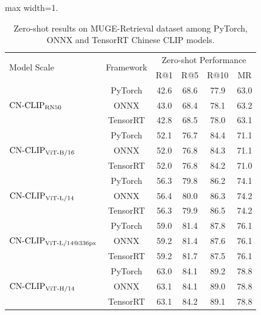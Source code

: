 \begin{table}[t]
\center
\small
\begin{adjustbox}{max width=1.\textwidth}
\begin{tabular}{@{\extracolsep{\fill}}lccccc}
\toprule
  \multirow{2}{*}{Model Scale} & \multirow{2}{*}{Framework}
  &\multicolumn{4}{c}{Zero-shot Performance}
  \\
   &  & R@1 & R@5 & R@10 & MR
  \\
\midrule
  \multirow{3}{*}{$\text{CN-CLIP}\rm_{RN50}$}
  & PyTorch	& 42.6	& 68.6	& 77.9	& 63.0 
  \\
  & ONNX	& 43.0 & 68.4 & 78.1 & 63.2
  \\
  & TensorRT	& 42.8 & 68.5 & 78.0 & 63.1
  \\ \midrule
  \multirow{3}{*}{$\text{CN-CLIP}\rm_{ViT\text{-}B/16}$}
  & PyTorch	& 52.1	& 76.7	& 84.4	& 71.1 
  \\
  & ONNX	& 52.0	& 76.8	& 84.3	& 71.1	
  \\
  & TensorRT	& 52.0	& 76.8	& 84.2	& 71.0
  \\ \midrule
  \multirow{3}{*}{$\text{CN-CLIP}\rm_{ViT\text{-}L/14}$}
  & PyTorch	& 56.3	& 79.8	& 86.2	& 74.1 
  \\
  & ONNX	& 56.4	& 80.0	& 86.3	& 74.2	
  \\
  & TensorRT	& 56.3 & 79.9	& 86.5	& 74.2
  \\ \midrule
  \multirow{3}{*}{$\text{CN-CLIP}\rm_{ViT\text{-}L/14@336px}$}
  & PyTorch	& 59.0	& 81.4	& 87.8	& 76.1
  \\
  & ONNX	& 59.2	& 81.4 & 87.6 & 76.1
  \\
  & TensorRT	& 59.2 & 81.7 & 87.5 & 76.1
  \\ \midrule
  \multirow{3}{*}{$\text{CN-CLIP}\rm_{ViT\text{-}H/14}$}
  & PyTorch	& 63.0	& 84.1	& 89.2	& 78.8 
  \\
  & ONNX	& 63.1	& 84.1	& 89.0	& 78.8	
  \\
  & TensorRT	& 63.1	& 84.2	& 89.1	& 78.8
  \\

\bottomrule
\end{tabular}
\end{adjustbox}
\caption{Zero-shot results on MUGE-Retrieval dataset among PyTorch, ONNX and TensorRT Chinese CLIP models.}
\label{tb:deployment_muge}
\end{table}
